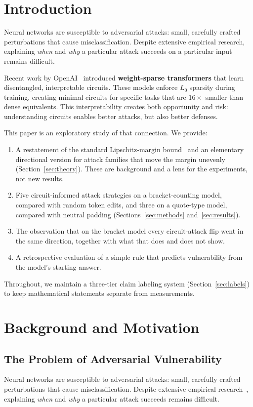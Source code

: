 \documentclass[11pt]{article}
\begin{document}
\section{Introduction}

Neural networks are susceptible to adversarial attacks: small, carefully crafted perturbations that cause misclassification. Despite extensive empirical research, explaining \emph{when} and \emph{why} a particular attack succeeds on a particular input remains difficult.

Recent work by OpenAI~\cite{gao2025} introduced \textbf{weight-sparse transformers} that learn disentangled, interpretable circuits. These models enforce $L_0$ sparsity during training, creating minimal circuits for specific tasks that are $16\times$ smaller than dense equivalents. This interpretability creates both opportunity and risk: understanding circuits enables better attacks, but also better defenses.

This paper is an exploratory study of that connection. We provide:
\begin{enumerate}
  \item A restatement of the standard Lipschitz-margin bound~\cite{hein2017,tsuzuku2018} and an elementary directional version for attack families that move the margin unevenly (Section~\ref{sec:theory}). These are background and a lens for the experiments, not new results.
  \item Five circuit-informed attack strategies on a bracket-counting model, compared with random token edits, and three on a quote-type model, compared with neutral padding (Sections~\ref{sec:methods} and~\ref{sec:results}).
  \item The observation that on the bracket model every circuit-attack flip went in the same direction, together with what that does and does not show.
  \item A retrospective evaluation of a simple rule that predicts vulnerability from the model's starting answer.
\end{enumerate}
Throughout, we maintain a three-tier claim labeling system (Section~\ref{sec:labels}) to keep mathematical statements separate from measurements.

\section{Background and Motivation}

\subsection{The Problem of Adversarial Vulnerability}
Neural networks are susceptible to adversarial attacks: small, carefully crafted perturbations that cause misclassification. Despite extensive empirical research~\cite{szegedy2014,goodfellow2015,madry2018}, explaining \emph{when} and \emph{why} a particular attack succeeds remains difficult.
\end{document}
